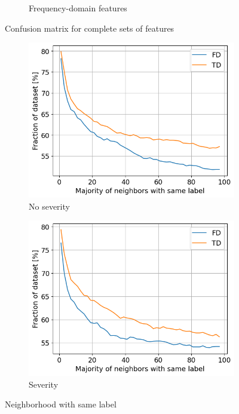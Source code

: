 \begin{figure}[h]
\begin{subfigure}[b]{0.49\textwidth}
        \caption{Frequency-domain features}
    \end{subfigure}
    \caption{Confusion matrix for complete sets of features}
\end{figure}

\begin{figure}[h]
    \centering
    \begin{subfigure}[b]{0.49\textwidth}
        \includegraphics[width=\textwidth]{assets/results/all-features/neighborhood.png}
        \caption{No severity}
    \end{subfigure}
    \hfill
    \begin{subfigure}[b]{0.49\textwidth}
        \includegraphics[width=\textwidth]{assets/results/all-features/neighborhood-severity.png}
        \caption{Severity}
    \end{subfigure}
    \caption{Neighborhood with same label}
\end{figure}

